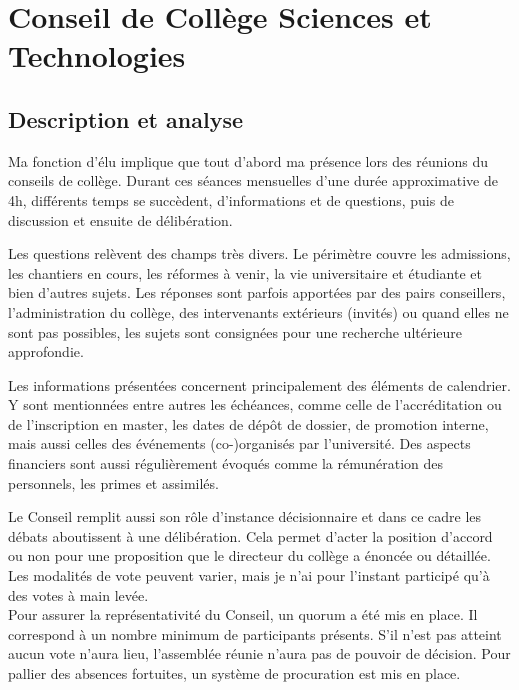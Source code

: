 \documentclass{article}
\begin{document}
\section{Conseil de Collège Sciences et Technologies}

\subsection{Description et analyse}
Ma fonction d'élu implique que tout d'abord ma présence lors des réunions du conseils de collège. Durant ces séances mensuelles d'une durée approximative de 4h, différents temps se succèdent, d'informations et de questions, puis de discussion et ensuite de délibération. 

Les questions relèvent des champs très divers. Le périmètre couvre les admissions, les chantiers en cours, les réformes à venir, la vie universitaire et étudiante et bien d'autres sujets. Les réponses sont parfois apportées par des pairs conseillers, l'administration du collège, des intervenants extérieurs (invités) ou quand elles ne sont pas  possibles, les sujets sont consignées pour une recherche ultérieure approfondie. 

Les informations présentées concernent principalement des éléments de calendrier. Y sont mentionnées entre autres les échéances, comme celle de l'accréditation ou de l'inscription en master, les dates de dépôt de dossier, de promotion interne, mais aussi celles des événements (co-)organisés par l'université. Des aspects financiers sont aussi régulièrement évoqués comme la rémunération des personnels, les primes et assimilés. 

Le Conseil remplit aussi son rôle d’instance décisionnaire et dans ce cadre les débats aboutissent à une délibération. 
Cela permet d'acter la position d'accord ou non pour une proposition que le directeur du collège a énoncée ou détaillée. 
Les modalités de vote peuvent varier, mais je n'ai pour l'instant participé qu’à des votes à main levée. \\
Pour assurer la représentativité du Conseil, un quorum a été mis en place. Il correspond à un nombre minimum de participants présents. 
S'il n'est pas atteint aucun vote n'aura lieu, l’assemblée réunie n’aura pas de pouvoir de décision. 
Pour pallier des absences fortuites, un système de procuration est mis en place.
\end{document}
